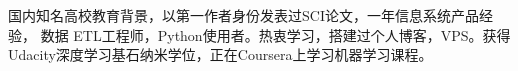 

\begin{cvparagraph}

国内知名高校教育背景，以第一作者身份发表过SCI论文，一年信息系统产品经验， 数据 ETL工程师，Python使用者。热衷学习，搭建过个人博客，VPS。获得Udacity深度学习基石纳米学位，正在Coursera上学习机器学习课程。
\end{cvparagraph}
